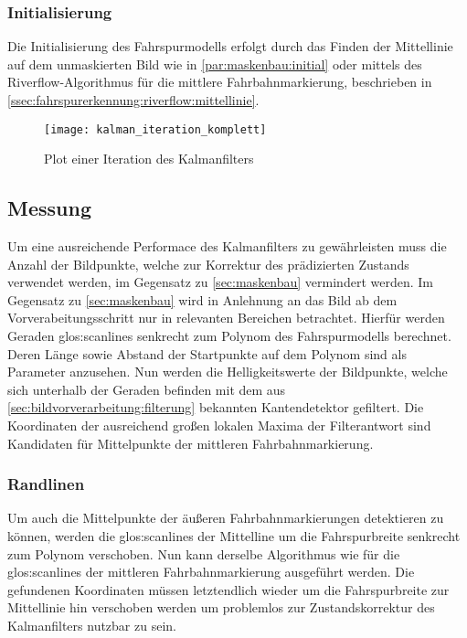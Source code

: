 \subsubsection{Initialisierung} 
\label{sssec:fahrspurerkennung:kalman:fahrspurmodell:initialisierung}
 Die Initialisierung des Fahrspurmodells erfolgt durch das Finden der Mittellinie auf dem unmaskierten Bild wie in \ref{par:maskenbau:initial} oder mittels des Riverflow-Algorithmus für die mittlere Fahrbahnmarkierung, beschrieben in \ref{ssec:fahrspurerkennung:riverflow:mittellinie}.
 
 \begin{figure}[htb]
 	\centering
 	\texttt{[image: kalman\_iteration\_komplett]}
 	\caption{Plot einer Iteration des Kalmanfilters}
 	\label{fig:kalman:iteration_komplett}
 \end{figure}
 
\subsection{Messung} \label{ssec:fahrspurerkennung:kalman:messung}
Um eine ausreichende Performace des Kalmanfilters zu gewährleisten muss die Anzahl der Bildpunkte, welche zur Korrektur des prädizierten Zustands verwendet werden, im Gegensatz zu \ref{sec:maskenbau} vermindert werden. Im Gegensatz zu \ref{sec:maskenbau} wird in Anlehnung an \autocite{risackRobustLaneRecognition} das Bild ab dem Vorverabeitungsschritt nur in relevanten Bereichen betrachtet.
Hierfür werden Geraden \flq \glspl{glos:scanline} \frq senkrecht zum Polynom des Fahrspurmodells berechnet. Deren Länge sowie Abstand der Startpunkte auf dem Polynom sind als Parameter anzusehen. Nun werden die Helligkeitswerte der Bildpunkte, welche sich unterhalb der Geraden befinden mit dem aus \ref{sec:bildvorverarbeitung:filterung} bekannten Kantendetektor gefiltert. Die Koordinaten der ausreichend großen lokalen Maxima der Filterantwort sind Kandidaten für Mittelpunkte der mittleren Fahrbahnmarkierung.

\subsubsection{Randlinen}
Um auch die Mittelpunkte der äußeren Fahrbahnmarkierungen detektieren zu können, werden die \glspl{glos:scanline} der Mittelline um die Fahrspurbreite senkrecht zum Polynom verschoben. Nun kann derselbe Algorithmus wie für die \glspl{glos:scanline} der mittleren Fahrbahnmarkierung ausgeführt werden. Die gefundenen Koordinaten müssen letztendlich wieder um die Fahrspurbreite zur Mittellinie hin verschoben werden um problemlos zur Zustandskorrektur des Kalmanfilters nutzbar zu sein.
 
